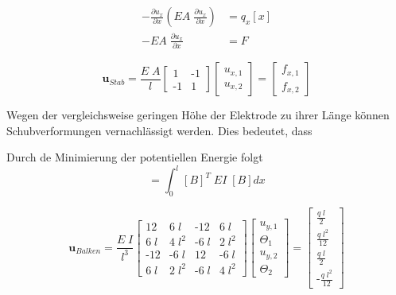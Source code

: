 \begin{align}
   - \frac{\partial u_x}{\partial x} \left( EA\; \frac{\partial u_x}{\partial x} \right) &= q_x[x]\\
    -EA\; \frac{\partial u_x}{\partial x} &= F
\end{align}

\begin{equation}
   [K_{\text{Stab}}] \boldsymbol{u}_{Stab} = \frac{E \; A}{l} 
   \begin{bmatrix}
    1 & \text{-}1 \\
    \text{-}1 & 1
   \end{bmatrix}
   \begin{bmatrix}
    u_{x,1} \\
    u_{x,2}
   \end{bmatrix}
   = 
   \begin{bmatrix}
    f_{x,1} \\
    f_{x,2}
   \end{bmatrix}
\end{equation}

Wegen der vergleichsweise geringen Höhe der Elektrode zu ihrer Länge können Schubverformungen vernachlässigt werden. Dies bedeutet, dass 


Durch de Minimierung der potentiellen Energie folgt
\begin{equation}
    [k] = \int_0^l [B]^T \; EI \; [B] dx
\end{equation}

\begin{equation}
    [K_{\text{Balken}}] \boldsymbol{u}_{Balken} = \frac{E \; I}{l^3} 
    \begin{bmatrix}
        12 & 6 \; l & \text{-}12 & 6 \; l        \\
        6 \; l & 4 \; l^2 & \text{-}6 \; l & 2 \; l^2 \\
        \text{-}12 & \text{-}6 \; l & 12 & \text{-}6 \; l      \\
        6 \; l & 2 \; l^2 & \text{-}6 \; l & 4 \; l^2
    \end{bmatrix}
    \begin{bmatrix}
        u_{y,1}  \\
        \Theta_1 \\
        u_{y,2}  \\
        \Theta_2
    \end{bmatrix}
    = 
    \begin{bmatrix}
        \frac{q \; l}{2}  \\
        \frac{q \; l^2}{12} \\
        \frac{q \; l}{2}  \\
        \text{-}\frac{q \; l^2}{12}
    \end{bmatrix} 
 \end{equation}

